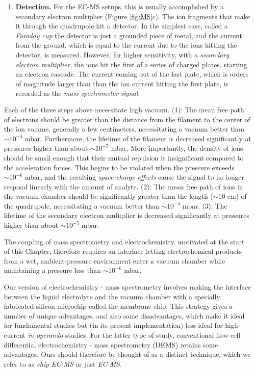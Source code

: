 \begin{enumerate}
	\item \textbf{Detection.} For the EC-MS setups, this is usually accomplished by a secondary electron multiplier (Figure \ref{fig:MS}c). The ion fragments that make it through the quadrupole hit a detector. In the simplest case, called a \textit{Faraday cup} the detector is just a grounded piece of metal, and the current from the ground, which is equal to the current due to the ions hitting the detector, is measured. However, for higher sensitivity, with a \textit{secondary electron multiplier}, the ions hit the first of a series of charged plates, starting an electron cascade. The current coming out of the last plate, which is orders of magnitude larger than than the ion current hitting the first plate, is recorded as the \textit{mass spectrometer signal}.
\end{enumerate}

Each of the three steps above necessitate high vacuum\cite{Gross2007, PfeifferKnowhow}. (1): The mean free path of electrons should be greater than the distance from the filament to the center of the ion volume, generally a few centimeters,  necessitating a vacuum better than $\sim 10^{-4}$ mbar\cite{Concepts2003}. Furthermore, the lifetime of the filament is decreased significantly at pressures higher than about $\sim 10^{-5}$ mbar. More importantly, the density of ions should be small enough that their mutual repulsion is insignificant compared to the acceleration forces. This begins to be violated when the pressure exceeds $\sim 10^{-6}$ mbar, and the resulting \textit{space-charge effects} cause the signal to no longer respond linearly with the amount of analyte\cite{PfeifferKnowhow, Harris2010}. (2): The mean free path of ions in the vacuum chamber should be significantly greater than the length ($\sim10$ cm) of the quadrupole, necessitating a vacuum better than $\sim 10^{-4}$ mbar\cite{Concepts2003}. (3), The lifetime of the secondary electron multiplier is decreased significantly at pressures higher than about $\sim 10^{-5}$ mbar.

The coupling of mass spectrometry and electrochemistry, motivated at the start of this Chapter, therefore requires an interface letting electrochemical products from a wet, ambient-pressure environment enter a vacuum chamber while maintaining a pressure less than $\sim 10^{-6}$ mbar.

Our version of electrochemistry - mass spectrometry involves making the interface between the liquid electrolyte and the vacuum chamber with a specially fabricated silicon microchip called the membrane chip. This strategy gives a number of unique advantages, and also some disadvantages, which make it ideal for fundamental studies but (in its present implementation) less ideal for high-current \textit{in-operando} studies. For the latter type of study, conventional flow-cell differential electrochemistry - mass spectrometry (DEMS)\cite{Baltruschat2004} retains some advantages. Ours should therefore be thought of as a distinct technique, which we refer to as \textit{chip EC-MS} or just \textit{EC-MS}.

